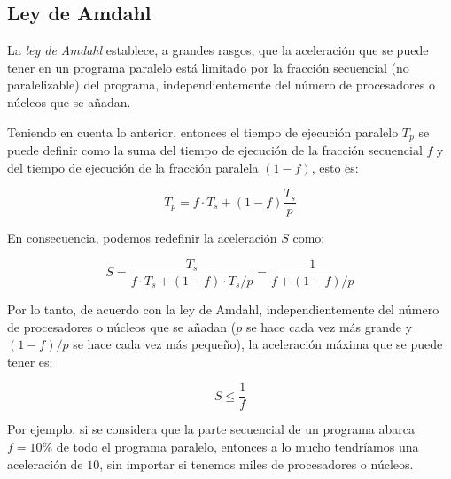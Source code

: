 \subsection{Ley de Amdahl}
\label{section:amdahl}

La \emph{ley de Amdahl} establece, a grandes rasgos, que la aceleración que se puede tener en un programa paralelo está limitado por la fracción secuencial (no paralelizable) del programa, independientemente del número de procesadores o núcleos que se añadan.

Teniendo en cuenta lo anterior, entonces el tiempo de ejecución paralelo $T_p$ se puede definir como la suma del tiempo de ejecución de la fracción secuencial $f$ y del tiempo de ejecución de la fracción paralela $\left(1 - f\right)$, esto es:

\[T_p = f \cdot T_s + \left(1 - f\right) \frac{T_s}{p}\]

En consecuencia, podemos redefinir la aceleración $S$ como:

\[S = \frac{T_s}{f \cdot T_s + \left(1 - f\right) \cdot T_s / p} = \frac{1}{f + \left(1 - f\right) / p}\]

Por lo tanto, de acuerdo con la ley de Amdahl, independientemente del número de procesadores o núcleos que se añadan ($p$ se hace cada vez más grande y $\left(1 - f\right) / p$ se hace cada vez más pequeño), la aceleración máxima que se puede tener es:

\[S \le \frac{1}{f}\]

Por ejemplo, si se considera que la parte secuencial de un programa abarca $f = 10\%$ de todo el programa paralelo, entonces a lo mucho tendríamos una aceleración de $10$, sin importar si tenemos miles de procesadores o núcleos. \cite{pacheco2011introduction}